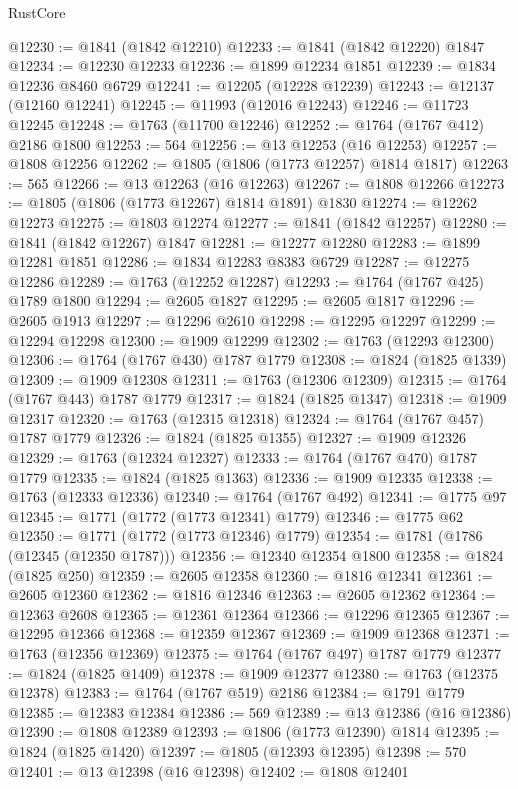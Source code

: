 \begin{lexlean}{RustCore}
\begin{coremodule}
@12230 := @1841 (@1842 @12210)
@12233 := @1841 (@1842 @12220) @1847
@12234 := @12230 @12233
@12236 := @1899 @12234 @1851
@12239 := @1834 @12236 @8460 @6729
@12241 := @12205 (@12228 @12239)
@12243 := @12137 (@12160 @12241)
@12245 := @11993 (@12016 @12243)
@12246 := @11723 @12245
@12248 := @1763 (@11700 @12246)
@12252 := @1764 (@1767 @412) @2186 @1800
@12253 := 564
@12256 := @13 @12253 (@16 @12253)
@12257 := @1808 @12256
@12262 := @1805 (@1806 (@1773 @12257) @1814 @1817)
@12263 := 565
@12266 := @13 @12263 (@16 @12263)
@12267 := @1808 @12266
@12273 := @1805 (@1806 (@1773 @12267) @1814 @1891) @1830
@12274 := @12262 @12273
@12275 := @1803 @12274
@12277 := @1841 (@1842 @12257)
@12280 := @1841 (@1842 @12267) @1847
@12281 := @12277 @12280
@12283 := @1899 @12281 @1851
@12286 := @1834 @12283 @8383 @6729
@12287 := @12275 @12286
@12289 := @1763 (@12252 @12287)
@12293 := @1764 (@1767 @425) @1789 @1800
@12294 := @2605 @1827
@12295 := @2605 @1817
@12296 := @2605 @1913
@12297 := @12296 @2610
@12298 := @12295 @12297
@12299 := @12294 @12298
@12300 := @1909 @12299
@12302 := @1763 (@12293 @12300)
@12306 := @1764 (@1767 @430) @1787 @1779
@12308 := @1824 (@1825 @1339)
@12309 := @1909 @12308
@12311 := @1763 (@12306 @12309)
@12315 := @1764 (@1767 @443) @1787 @1779
@12317 := @1824 (@1825 @1347)
@12318 := @1909 @12317
@12320 := @1763 (@12315 @12318)
@12324 := @1764 (@1767 @457) @1787 @1779
@12326 := @1824 (@1825 @1355)
@12327 := @1909 @12326
@12329 := @1763 (@12324 @12327)
@12333 := @1764 (@1767 @470) @1787 @1779
@12335 := @1824 (@1825 @1363)
@12336 := @1909 @12335
@12338 := @1763 (@12333 @12336)
@12340 := @1764 (@1767 @492)
@12341 := @1775 @97
@12345 := @1771 (@1772 (@1773 @12341) @1779)
@12346 := @1775 @62
@12350 := @1771 (@1772 (@1773 @12346) @1779)
@12354 := @1781 (@1786 (@12345 (@12350 @1787)))
@12356 := @12340 @12354 @1800
@12358 := @1824 (@1825 @250)
@12359 := @2605 @12358
@12360 := @1816 @12341
@12361 := @2605 @12360
@12362 := @1816 @12346
@12363 := @2605 @12362
@12364 := @12363 @2608
@12365 := @12361 @12364
@12366 := @12296 @12365
@12367 := @12295 @12366
@12368 := @12359 @12367
@12369 := @1909 @12368
@12371 := @1763 (@12356 @12369)
@12375 := @1764 (@1767 @497) @1787 @1779
@12377 := @1824 (@1825 @1409)
@12378 := @1909 @12377
@12380 := @1763 (@12375 @12378)
@12383 := @1764 (@1767 @519) @2186
@12384 := @1791 @1779
@12385 := @12383 @12384
@12386 := 569
@12389 := @13 @12386 (@16 @12386)
@12390 := @1808 @12389
@12393 := @1806 (@1773 @12390) @1814
@12395 := @1824 (@1825 @1420)
@12397 := @1805 (@12393 @12395)
@12398 := 570
@12401 := @13 @12398 (@16 @12398)
@12402 := @1808 @12401

\end{coremodule}
\end{lexlean}
